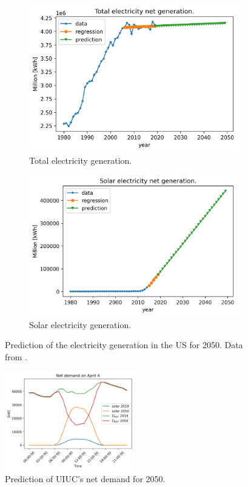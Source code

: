 \documentclass[11pt,letterpaper]{article}
\begin{document}
	\begin{figure}[htbp!]
		\centering
		\begin{subfigure}[t]{0.38\textwidth}
			\centering
			\includegraphics[width=\linewidth]{figures/us-prediction1}
			\caption{Total electricity generation.}
		\end{subfigure}
		\begin{subfigure}[t]{0.40\textwidth}
			\centering
			\includegraphics[width=\linewidth]{figures/us-prediction2}
			\caption{Solar electricity generation.}
		\end{subfigure}
		\hfill
		\caption{Prediction of the electricity generation in the \gls{US} for 2050. Data from \cite{us_energy_information_administration_electric_2020}.}
		\label{fig:prediction}
	\end{figure}

	\begin{figure}[htbp!]
	    \centering
		\includegraphics[height=4.3cm]{figures/uiuc-duck}
		\hfill
		\caption{Prediction of \gls{UIUC}'s net demand for 2050.}
		\label{fig:uiuc-duck1}
	\end{figure}
\end{document}

